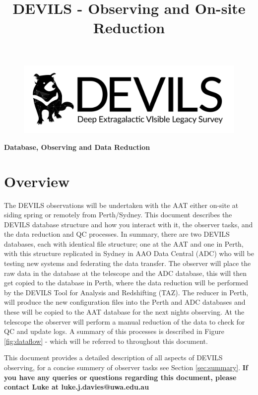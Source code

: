 \documentclass[12pt]{article}
\begin{document}
\title{DEVILS - Observing and On-site Reduction}
\begin{center}

\begin{figure}
\begin{center}
\includegraphics[scale=0.8]{devils-logo_big.png}
\end{center}
\end{figure}

\Huge {\textcolor{PineGreen}{\textbf{Database, Observing and Data Reduction}}}
\end{center}
\normalsize


\section{Overview}

The DEVILS observations will be undertaken with the AAT either on-site at siding spring or remotely from Perth/Sydney. This document describes the DEVILS database structure and how you interact with it, the observer tasks, and the data reduction and QC processes. In summary, there are two DEVILS databases, each with identical file structure; one at the AAT and one in Perth, with this structure replicated in Sydney in AAO Data Central (ADC) who will be testing new systems and federating the data transfer. The observer will place the raw data in the database at the telescope and the ADC database, this will then get copied to the database in Perth, where the data reduction will be performed by the DEVILS Tool for Analysis and Redshifting (TAZ). The reducer in Perth, will produce the new configuration files into the Perth and ADC databases and these will be copied to the AAT database for the next nights observing. At the telescope the observer will perform a manual reduction of the data to check for QC and update logs. A summary of this processes is described in Figure \ref{fig:dataflow} - which will be referred to throughout this document. 

This document provides a detailed description of all aspects of DEVILS observing, for a concise summery of observer tasks see Section \ref{sec:summary}. \textcolor{PineGreen}{\textbf{If you have any queries or questions regarding this document, please contact Luke at luke.j.davies@uwa.edu.au}}\\
\end{document}

